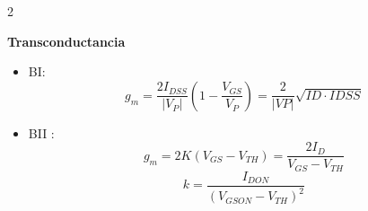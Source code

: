 \documentclass{article}
\begin{document}
\begin{multicols}{2}
\begin{itemform}
    

    
    \item \textbf{Transconductancia}
    \begin{itemize}
        \item BI: 
        $$g_m = \dfrac{2I_{DSS}}{|V_P|}\left(1 - \dfrac{V_{GS}}{V_P}\right)=\dfrac{2}{|VP|} \sqrt{ID \cdot IDSS}$$
        \item BII : 
        $$g_m = 2K(V_{GS} - V_{TH}) = \dfrac{2I_D}{V_{GS}-V_{TH}}$$
        $$k=\dfrac{I_{DON}}{(V_{GSON}-V_{TH})^2}$$

    \end{itemize}

    
\end{itemform}

\end{multicols}


\newpage
\end{document}
